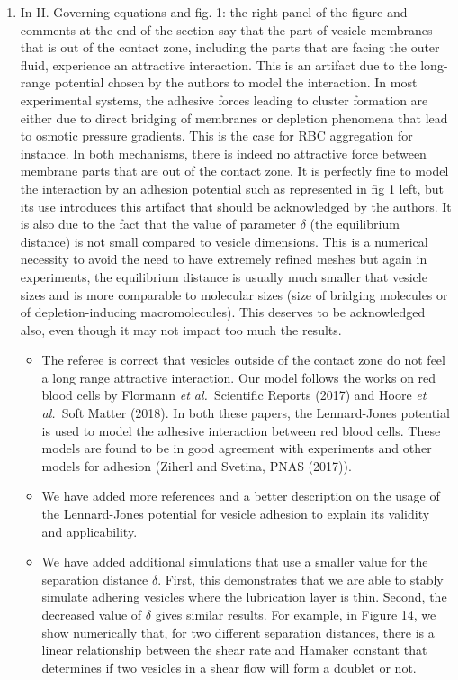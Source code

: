 \documentclass[11pt]{article}
\newcommand{\comment}[1]{{\color{blue} #1}}
\begin{document}
\begin{enumerate}
\item\comment{In II. Governing equations and fig. 1: the right panel of the
figure and comments at the end of the section say that the part of
vesicle membranes that is out of the contact zone, including the parts
that are facing the outer fluid, experience an attractive interaction.
This is an artifact due to the long-range potential chosen by the
authors to model the interaction. In most experimental systems, the
adhesive forces leading to cluster formation are either due to direct
bridging of membranes or depletion phenomena that lead to osmotic
pressure gradients. This is the case for RBC aggregation for instance.
In both mechanisms, there is indeed no attractive force between membrane
parts that are out of the contact zone. It is perfectly fine to model
the interaction by an adhesion potential such as represented in fig 1
left, but its use introduces this artifact that should be acknowledged
by the authors. It is also due to the fact that the value of parameter
$\delta$ (the equilibrium distance) is not small compared to vesicle
dimensions. This is a numerical necessity to avoid the need to have
extremely refined meshes but again in experiments, the equilibrium
distance is usually much smaller that vesicle sizes and is more
comparable to molecular sizes (size of bridging molecules or of
depletion-inducing macromolecules). This deserves to be acknowledged
also, even though it may not impact too much the results.}
\begin{itemize}
  \item The referee is correct that vesicles outside of the contact zone
    do not feel a long range attractive interaction.  Our model follows
    the works on red blood cells by Flormann {\em et al.}~Scientific
    Reports (2017) and Hoore {\em et al.}~Soft Matter (2018).  In both
    these papers, the Lennard-Jones potential is used to model the
    adhesive interaction between red blood cells.  These models are
    found to be in good agreement with experiments and other models for
    adhesion (Ziherl and Svetina, PNAS (2017)).

  \item We have added more references and a better description on the
    usage of the Lennard-Jones potential for vesicle adhesion to explain
    its validity and applicability.

  \item We have added additional simulations that use a smaller value
    for the separation distance $\delta$.  First, this demonstrates that
    we are able to stably simulate adhering vesicles where the
    lubrication layer is thin.  Second, the decreased value of $\delta$
    gives similar results.  For example, in Figure 14, we show
    numerically that, for two different separation distances, there is a
    linear relationship between the shear rate and Hamaker constant that
    determines if two vesicles in a shear flow will form a doublet or
    not.
\end{itemize}


\end{enumerate}
\end{document}
